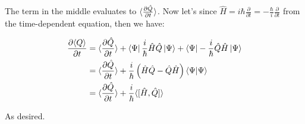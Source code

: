 \documentclass[10pt]{article}
\begin{document}
\begin{enumerate}[(a)]
\begin{solution}
            The term in the middle evaluates to $\langle \frac{\partial \hat Q}{\partial t} \rangle$. Now let's since $\hat H = i \hbar \frac{\partial}{\partial t} = -\frac{\hbar}{i}\frac{\partial}{\partial t}$ from the time-dependent \schrodinger equation, then we have: 

            \begin{align*}
                \frac{\partial \langle Q \rangle}{\partial t} &= \langle \frac{\partial \hat Q}{\partial t} \rangle + \bra{\Psi}\frac{i}{\hbar}\hat H\hat Q\ket \Psi + \bra{\Psi}-\frac{i}{\hbar}\hat Q\hat H \ket \Psi\\
                &= \langle \frac{\partial \hat Q}{\partial t} \rangle + \frac{i}{\hbar}\left(\hat H \hat Q - \hat Q \hat H\right) \braket{\Psi}{\Psi}\\
                &= \langle \frac{\partial \hat Q}{\partial t} \rangle + \frac{i}{\hbar}\langle [\hat H, \hat Q] \rangle
            \end{align*}

            As desired.  

        \end{solution}
    \end{enumerate}
\end{document}
